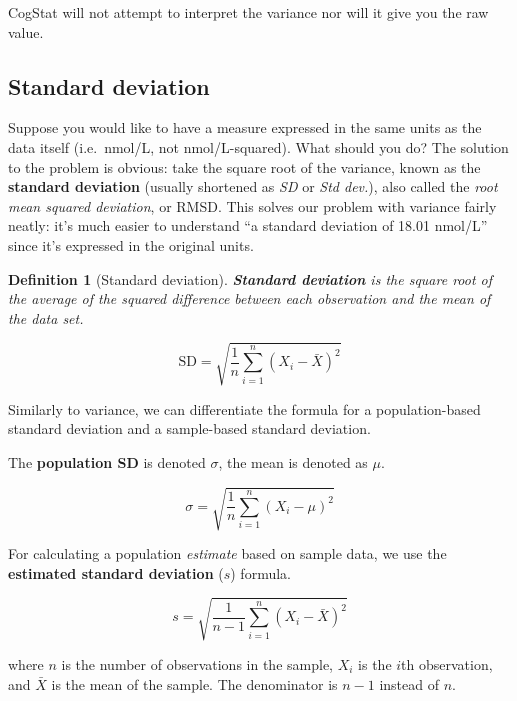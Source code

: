 \documentclass[
  11pt,
]{book}
\theoremstyle{indenteddefinition}
\newtheorem{definition}{Definition}[chapter]
\theoremstyle{indenteddefinition}
\theoremstyle{definition}
\theoremstyle{definition}
\theoremstyle{remark}
\begin{document}
CogStat will not attempt to interpret the variance nor will it give you the raw value.

\hypertarget{sd}{%
\subsection{Standard deviation}\label{sd}}

Suppose you would like to have a measure expressed in the same units as the data itself (i.e.~nmol/L, not nmol/L-squared). What should you do? The solution to the problem is obvious: take the square root of the variance, known as the \textbf{standard deviation} (usually shortened as \emph{SD} or \emph{Std dev.}), also called the \emph{root mean squared deviation}, or RMSD. This solves our problem with variance fairly neatly: it's much easier to understand ``a standard deviation of 18.01 nmol/L'' since it's expressed in the original units.

\begin{definition}[Standard deviation]
\protect\hypertarget{def:defSD}{}\label{def:defSD}\textbf{Standard deviation} is the \emph{square root} of the average of the \emph{squared difference} between each observation and the \emph{mean} of the data set.

\[
\mbox{SD} = \sqrt{ \frac{1}{n} \sum_{i=1}^n \left( X_i - \bar{X} \right)^2 }
\]
\end{definition}

\hypertarget{calloutSD}{}
\begin{callout}

Similarly to variance, we can differentiate the formula for a population-based standard deviation and a sample-based standard deviation.

The \textbf{population SD} is denoted \(\sigma\), the mean is denoted as \(\mu\).

\[
\sigma = \sqrt{ \frac{1}{n} \sum_{i=1}^n \left( X_i - \mu \right)^2 }
\]

For calculating a population \emph{estimate} based on sample data, we use the \textbf{estimated standard deviation} (\(s\)) formula.

\[
s = \sqrt{ \frac{1}{n-1} \sum_{i=1}^n \left( X_i - \bar{X} \right)^2 }
\]

where \(n\) is the number of observations in the sample, \(X_i\) is the \(i\)th observation, and \(\bar{X}\) is the mean of the sample. The denominator is \(n-1\) instead of \(n\).

\end{callout}
\end{document}
